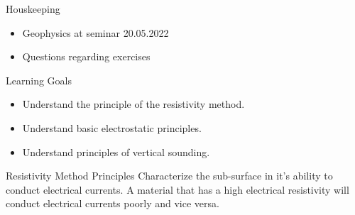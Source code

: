 \begin{frame}
  \begin{PointSix}{Houskeeping}
    \begin{itemize}
      \item \alert{Geophysics at seminar 20.05.2022}
      \item \alert{Questions regarding exercises}
    \end{itemize}
  \end{PointSix}
\end{frame}

\begin{frame}
  \begin{PointSix}{Learning Goals}
    \begin{itemize}
      \item \alert{Understand the principle of the resistivity method.}
      \item \alert{Understand basic electrostatic principles.}
      \item \alert{Understand principles of vertical sounding.}
    \end{itemize}
  \end{PointSix}
\end{frame}

\begin{frame}
  \begin{PointSix}{Resistivity Method Principles}
      \small
      Characterize the sub-surface in it's ability to conduct electrical currents. A material that has a high electrical resistivity will conduct electrical currents poorly and vice versa.
  \end{PointSix}
\end{frame}

